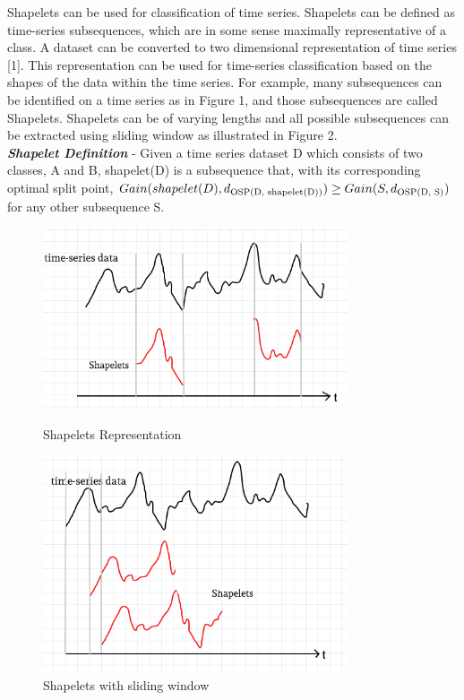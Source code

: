 \documentclass[conference]{IEEEtran}  %
\begin{document}
Shapelets can be used for classification of time series. Shapelets can be defined as time-series subsequences, which are in some sense maximally representative of a class. A dataset can be converted to two dimensional representation of time series [1]. This representation can be used for time-series classification based on the shapes of the data within the time series. For example, many subsequences can be identified on a time series as in Figure 1, and those subsequences are called Shapelets. Shapelets can be of varying lengths and all possible subsequences can be extracted using sliding window as illustrated in Figure 2.
\medskip\\
\textbf{\textit{Shapelet Definition}} - Given a time series dataset D which consists of two classes, A and B, shapelet(D) is a subsequence that, with its corresponding optimal split point, \(Gain(shapelet(D), d\textsubscript{OSP(D, shapelet(D))}) \geq Gain(S, d\textsubscript{OSP(D, S)})\) for any other subsequence S.
\begin{figure}
\centering
\begin{minipage}{9cm}
\parbox{9cm}{
\includegraphics[width=9cm]{shapelet1.png}
\caption{Shapelets Representation}
\label{fig:2figsA}}
\qquad
\parbox{9cm}{
\includegraphics[width=9cm]{shapelet2.png}
\caption{Shapelets with sliding window}
\label{fig:2figsB}}
\end{minipage}
\end{figure}
\end{document}
